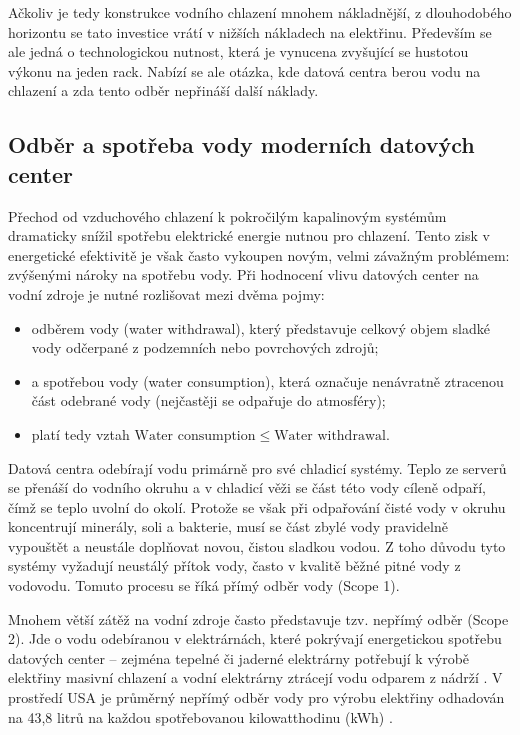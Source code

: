 Ačkoliv je tedy konstrukce vodního chlazení mnohem nákladnější, z dlouhodobého horizontu se tato investice vrátí v nižších nákladech na elektřinu. Především se ale jedná o technologickou nutnost, která je vynucena zvyšující se hustotou výkonu na jeden rack. Nabízí se ale otázka, kde datová centra berou vodu na chlazení a zda tento odběr nepřináší další náklady.

\subsection{Odběr a spotřeba vody moderních datových center}
\label{subsec:voda}

Přechod od vzduchového chlazení k pokročilým kapalinovým systémům dramaticky snížil spotřebu elektrické energie nutnou pro chlazení. Tento zisk v energetické efektivitě je však často vykoupen novým, velmi závažným problémem: zvýšenými nároky na spotřebu vody. Při hodnocení vlivu datových center na vodní zdroje je nutné rozlišovat mezi dvěma pojmy:

\begin{itemize}
    \item odběrem vody (water withdrawal), který představuje celkový objem sladké vody odčerpané z podzemních nebo povrchových zdrojů;
    \item a spotřebou vody (water consumption), která označuje nenávratně ztracenou část odebrané vody (nejčastěji se odpařuje do atmosféry); \cite{li_making_2025}
    \item platí tedy vztah $\text{Water consumption} \le \text{Water withdrawal}.$
\end{itemize}

Datová centra odebírají vodu primárně pro své chladicí systémy. Teplo ze serverů se přenáší do vodního okruhu a v chladicí věži se část této vody cíleně odpaří, čímž se teplo uvolní do okolí. Protože se však při odpařování čisté vody v okruhu koncentrují minerály, soli a bakterie, musí se část zbylé vody pravidelně vypouštět a neustále doplňovat novou, čistou sladkou vodou. Z toho důvodu tyto systémy vyžadují neustálý přítok vody, často v kvalitě běžné pitné vody z vodovodu. \cite{li_making_2025} Tomuto procesu se říká přímý odběr vody (Scope 1).

Mnohem větší zátěž na vodní zdroje často představuje tzv. nepřímý odběr (Scope 2). Jde o vodu odebíranou v elektrárnách, které pokrývají energetickou spotřebu datových center – zejména tepelné či jaderné elektrárny potřebují k výrobě elektřiny masivní chlazení a vodní elektrárny ztrácejí vodu odparem z nádrží \cite{li_making_2025, LBNL-2001637}. V prostředí USA je průměrný nepřímý odběr vody pro výrobu elektřiny odhadován na 43,8 litrů na každou spotřebovanou kilowatthodinu (kWh) \cite{li_making_2025}.

